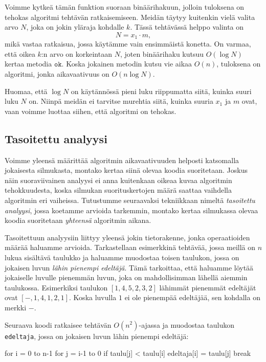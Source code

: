 Voimme kytkeä tämän funktion suoraan binäärihakuun,
jolloin tuloksena on tehokas algoritmi tehtävän ratkaisemiseen.
Meidän täytyy kuitenkin vielä valita arvo $N$,
joka on jokin yläraja kohdalle $k$.
Tässä tehtävässä helppo valinta on
\[N = x_1 \cdot m,\]
mikä vastaa ratkaisua, jossa käytämme vain ensimmäistä konetta.
On varmaa, että oikea $k$:n arvo on korkeintaan $N$,
joten binäärihaku kutsuu $O(\log N)$ kertaa metodia $\texttt{ok}$.
Koska jokainen metodin kutsu vie aikaa $O(n)$,
tuloksena on algoritmi, jonka aikavaativuus on $O(n \log N)$.

Huomaa, että $\log N$ on käytännössä pieni luku riippumatta
siitä, kuinka suuri luku $N$ on.
Niinpä meidän ei tarvitse murehtia siitä,
kuinka suuria $x_1$ ja $m$ ovat,
vaan voimme luottaa siihen, että algoritmi on tehokas.

\subsection{Tasoitettu analyysi}

Voimme yleensä määrittää algoritmin aikavaativuuden
helposti katsomalla jokaisesta silmukasta,
montako kertaa siinä olevaa koodia suoritetaan.
Joskus näin suoraviivainen analyysi ei anna kuitenkaan
oikeaa kuvaa algoritmin tehokkuudesta,
koska silmukan suorituskertojen määrä saattaa vaihdella
algoritmin eri vaiheissa.
Tutustumme seuraavaksi tekniikkaan nimeltä
\emph{tasoitettu analyysi}, jossa koetamme arvioida tarkemmin,
montako kertaa silmukassa olevaa koodia suoritetaan
\emph{yhteensä} algoritmin aikana.

Tasoitettuun analyysiin liittyy yleensä jokin tietorakenne,
jonka operaatioiden määrää haluamme arvioida.
Tarkastellaan esimerkkinä tehtävää,
jossa meillä on $n$ lukua sisältävä taulukko
ja haluamme muodostaa toisen taulukon,
jossa on jokaisen luvun \emph{lähin pienempi edeltäjä}.
Tämä tarkoittaa, että haluamme löytää jokaiselle luvulle
pienemmän luvun, joka on mahdollisimman lähellä aiemmin taulukossa.
Esimerkiksi taulukon $[1,4,5,2,3,2]$
lähimmät pienemmät edeltäjät ovat $[-,1,4,1,2,1]$.
Koska luvulla $1$ ei ole pienempää edeltäjää,
sen kohdalla on merkki $-$.

Seuraava koodi ratkaisee tehtävän $O(n^2)$-ajassa ja muodostaa
taulukon \texttt{edeltaja}, jossa on jokaisen luvun lähin pienempi edeltäjä:

\begin{code}
for i = 0 to n-1
    for j = i-1 to 0
        if taulu[j] < taulu[i]
            edeltaja[i] = taulu[j]
            break
\end{code}

